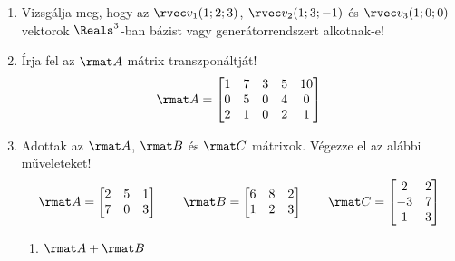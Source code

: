 \documentclass[a4paper, 12pt]{scrartcl}
\begin{document}
\begin{enumerate}
\begin{center}
        \end{center}

  \item Vizsgálja meg, hogy az $\rvec v_1(1; 2; 3)$, $\rvec v_2(1; 3; -1)$ és
        $\rvec v_3 (1; 0; 0)$ vektorok $\Reals^3$-ban bázist vagy
        generátorrendszert alkotnak-e!

  \item Írja fel az $\rmat A$ mátrix transzponáltját!
        $$
          \rmat A = \begin{bmatrix}
            1 & 7 & 3 & 5 & 10 \\
            0 & 5 & 0 & 4 & 0  \\
            2 & 1 & 0 & 2 & 1
          \end{bmatrix}
        $$

  \item Adottak az $\rmat A$, $\rmat B$ és $\rmat C$ mátrixok. Végezze el az
        alábbi műveleteket!
        $$
          \rmat A =\begin{bmatrix}
            2 & 5 & 1 \\
            7 & 0 & 3
          \end{bmatrix}
          \qquad
          \rmat B =\begin{bmatrix}
            6 & 8 & 2 \\
            1 & 2 & 3
          \end{bmatrix}
          \qquad
          \rmat C =\begin{bmatrix}
            2  & 2 \\
            -3 & 7 \\
            1  & 3
          \end{bmatrix}
        $$
        \begin{multicols}{3}
          \begin{enumerate}
            \item $\rmat A + \rmat B$


\end{enumerate}
\end{multicols}
\end{enumerate}
\end{document}
